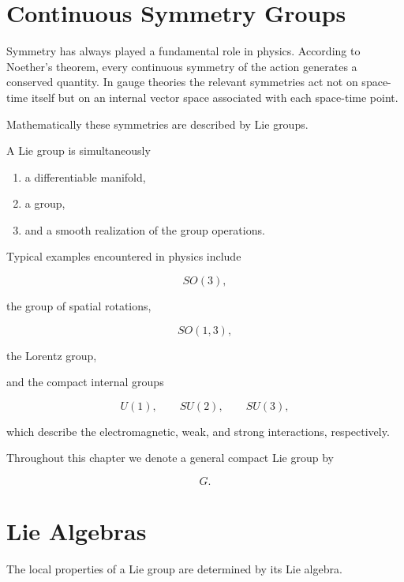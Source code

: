 
\section{Continuous Symmetry Groups}

Symmetry has always played a fundamental role in physics. According to
Noether's theorem, every continuous symmetry of the action generates a
conserved quantity. In gauge theories the relevant symmetries act not on
space-time itself but on an internal vector space associated with each
space-time point.

Mathematically these symmetries are described by Lie groups.

A Lie group is simultaneously

\begin{enumerate}

\item a differentiable manifold,

\item a group,

\item and a smooth realization of the group operations.

\end{enumerate}

Typical examples encountered in physics include

\[
SO(3),
\]

the group of spatial rotations,

\[
SO(1,3),
\]

the Lorentz group,

and the compact internal groups

\[
U(1),
\qquad
SU(2),
\qquad
SU(3),
\]

which describe the electromagnetic, weak, and strong interactions,
respectively.

Throughout this chapter we denote a general compact Lie group by

\[
G.
\]


\section{Lie Algebras}

The local properties of a Lie group are determined by its Lie algebra.

